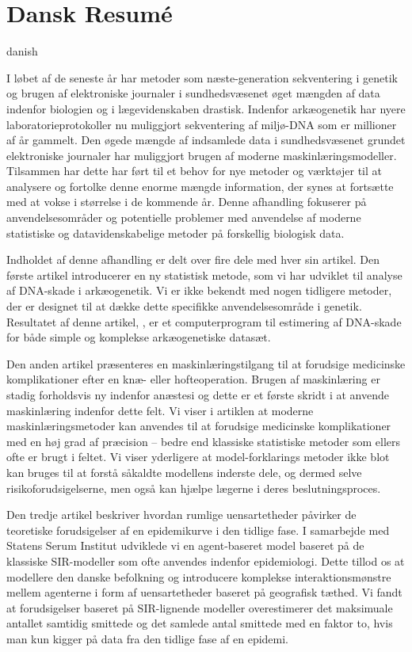 \chapter{Dansk Resumé}

\begin{otherlanguage*}{danish}

    I løbet af de seneste år har metoder som næste-generation sekventering i genetik og brugen af elektroniske journaler i sundhedsvæsenet øget mængden af data indenfor biologien og i lægevidenskaben drastisk. Indenfor arkæogenetik har nyere laboratorieprotokoller nu muliggjort sekventering af miljø-DNA som er millioner af år gammelt. Den øgede mængde af indsamlede data i sundhedsvæsenet grundet elektroniske journaler har muliggjort brugen af moderne maskinlæringsmodeller. Tilsammen har dette har ført til et behov for nye metoder og værktøjer til at analysere og fortolke denne enorme mængde information, der synes at fortsætte med at vokse i størrelse i de kommende år. Denne afhandling fokuserer på anvendelsesområder og potentielle problemer med anvendelse af moderne statistiske og datavidenskabelige metoder på forskellig biologisk data.

    Indholdet af denne afhandling er delt over fire dele med hver sin artikel. Den første artikel introducerer en ny statistisk metode, som vi har udviklet til analyse af DNA-skade i arkæogenetik. Vi er ikke bekendt med nogen tidligere metoder, der er designet til at dække dette specifikke anvendelsesområde i genetik. Resultatet af denne artikel, \metaDMG, er et computerprogram til estimering af DNA-skade for både simple og komplekse arkæogenetiske datasæt.

    Den anden artikel præsenteres en maskinlæringstilgang til at forudsige medicinske komplikationer efter en knæ- eller hofteoperation. Brugen af maskinlæring er stadig forholdsvis ny indenfor anæstesi og dette er et første skridt i at anvende maskinlæring indenfor dette felt. Vi viser i artiklen at moderne maskinlæringsmetoder kan anvendes til at forudsige medicinske komplikationer med en høj grad af præcision -- bedre end klassiske statistiske metoder som ellers ofte er brugt i feltet. Vi viser yderligere at model-forklarings metoder ikke blot kan bruges til at forstå såkaldte modellens inderste dele, og dermed selve risikoforudsigelserne, men også kan hjælpe lægerne i deres beslutningsproces.

    Den tredje artikel beskriver hvordan rumlige uensartetheder påvirker de teoretiske forudsigelser af en epidemikurve i den tidlige fase. I samarbejde med Statens Serum Institut udviklede vi en agent-baseret model baseret på de klassiske SIR-modeller som ofte anvendes indenfor epidemiologi. Dette tillod os at modellere den danske befolkning og introducere komplekse interaktionsmønstre mellem agenterne i form af uensartetheder baseret på geografisk tæthed. Vi fandt at forudsigelser baseret på SIR-lignende modeller overestimerer det maksimuale antallet samtidig smittede og det samlede antal smittede med en faktor to, hvis man kun kigger på data fra den tidlige fase af en epidemi.


\end{otherlanguage*}
